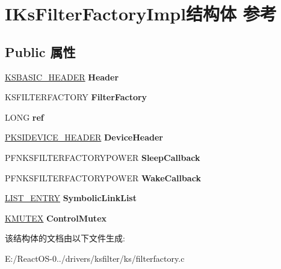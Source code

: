 \hypertarget{struct_i_ks_filter_factory_impl}{}\section{I\+Ks\+Filter\+Factory\+Impl结构体 参考}
\label{struct_i_ks_filter_factory_impl}
\subsection*{Public 属性}
\begin{DoxyCompactItemize}
\item 
\mbox{\label{struct_i_ks_filter_factory_impl_ad3266ff44c9e466680a0eba14353a583}} 
\hyperlink{struct_k_s_b_a_s_i_c___h_e_a_d_e_r}{K\+S\+B\+A\+S\+I\+C\+\_\+\+H\+E\+A\+D\+ER} {\bfseries Header}
\item 
\mbox{\label{struct_i_ks_filter_factory_impl_a4daee64afe024c01d46bd01c229e362f}} 
K\+S\+F\+I\+L\+T\+E\+R\+F\+A\+C\+T\+O\+RY {\bfseries Filter\+Factory}
\item 
\mbox{\label{struct_i_ks_filter_factory_impl_ada82a313887b82930a35c1b0f26596e8}} 
L\+O\+NG {\bfseries ref}
\item 
\mbox{\label{struct_i_ks_filter_factory_impl_a38621ff2099602da7fad7c7a8bebc12a}} 
\hyperlink{struct_k_s_i_d_e_v_i_c_e___h_e_a_d_e_r}{P\+K\+S\+I\+D\+E\+V\+I\+C\+E\+\_\+\+H\+E\+A\+D\+ER} {\bfseries Device\+Header}
\item 
\mbox{\label{struct_i_ks_filter_factory_impl_a4401f4f4bb980624bfc92b5d5695b0f1}} 
P\+F\+N\+K\+S\+F\+I\+L\+T\+E\+R\+F\+A\+C\+T\+O\+R\+Y\+P\+O\+W\+ER {\bfseries Sleep\+Callback}
\item 
\mbox{\label{struct_i_ks_filter_factory_impl_a66472a43885612482888ffb94ab3bcfe}} 
P\+F\+N\+K\+S\+F\+I\+L\+T\+E\+R\+F\+A\+C\+T\+O\+R\+Y\+P\+O\+W\+ER {\bfseries Wake\+Callback}
\item 
\mbox{\label{struct_i_ks_filter_factory_impl_aa070314603b0bf4527f75fd9719ddfaf}} 
\hyperlink{struct___l_i_s_t___e_n_t_r_y}{L\+I\+S\+T\+\_\+\+E\+N\+T\+RY} {\bfseries Symbolic\+Link\+List}
\item 
\mbox{\label{struct_i_ks_filter_factory_impl_a73dd4525f81c65876f84a4c5d88827dc}} 
\hyperlink{struct___k_m_u_t_a_n_t}{K\+M\+U\+T\+EX} {\bfseries Control\+Mutex}
\end{DoxyCompactItemize}


该结构体的文档由以下文件生成\+:\begin{DoxyCompactItemize}
\item 
E\+:/\+React\+O\+S-\/0../drivers/ksfilter/ks/filterfactory.\+c\end{DoxyCompactItemize}
